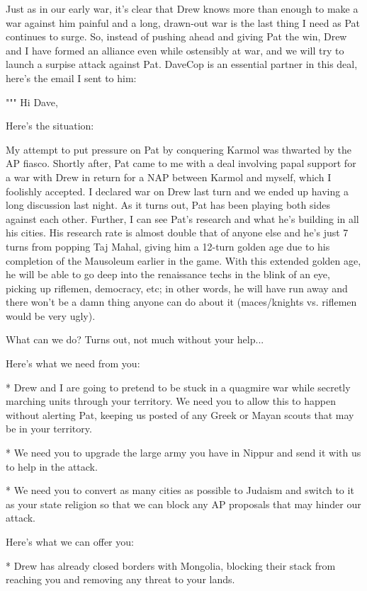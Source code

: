 \documentclass[10pt]{article}
\begin{document}
Just as in our early war, it's clear that Drew knows more than enough
to make a war against him painful and a long, drawn-out war is the
last thing I need as Pat continues to surge. So, instead of pushing
ahead and giving Pat the win, Drew and I have formed an alliance even
while ostensibly at war, and we will try to launch a surpise attack
against Pat. DaveCop is an essential partner in this deal, here's the
email I sent to him:

"""
Hi Dave,

Here's the situation:

My attempt to put pressure on Pat by conquering
Karmol was thwarted by the AP fiasco. Shortly after, Pat came to me
with a deal involving papal support for a war with Drew in return for
a NAP between Karmol and myself, which I foolishly accepted. I
declared war on Drew last turn and we ended up having a long
discussion last night. As it turns out, Pat has been playing both
sides against each other. Further, I can see Pat's research and what
he's building in all his cities. His research rate is almost double
that of anyone else and he's just 7 turns from popping Taj Mahal,
giving him a 12-turn golden age due to his completion of the Mausoleum
earlier in the game. With this extended golden age, he will be able to
go deep into the renaissance techs in the blink of an eye, picking up
riflemen, democracy, etc; in other words, he will have run away and
there won't be a damn thing anyone can do about it (maces/knights
vs. riflemen would be very ugly).

What can we do? Turns out, not much without your help...

Here's what we need from you:

* Drew and I are going to pretend to be stuck in a quagmire war while
secretly marching units through your territory. We need you to allow
this to happen without alerting Pat, keeping us posted of any Greek or
Mayan scouts that may be in your territory.

* We need you to upgrade the large army you have in Nippur and send it
with us to help in the attack.

* We need you to convert as many cities as possible to Judaism and
switch to it as your state religion so that we can block any AP
proposals that may hinder our attack.

Here's what we can offer you:

* Drew has already closed borders with Mongolia, blocking their stack
from reaching you and removing any threat to your lands.
\end{document}
